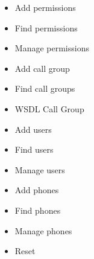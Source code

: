 \documentclass[letterpaper,10pt,english]{sphinxmanual}
\begin{document}
\begin{description}
\item[{}] \leavevmode\begin{itemize}
\item {} 
Add permissions

\item {} 
Find permissions

\item {} 
Manage permissions

\end{itemize}

\item[{}] \leavevmode\begin{itemize}
\item {} 
Add call group

\item {} 
Find call groups

\item {} 
WSDL Call Group

\end{itemize}

\item[{}] \leavevmode\begin{itemize}
\item {} 
Add users

\item {} 
Find users

\item {} 
Manage users

\end{itemize}

\item[{}] \leavevmode\begin{itemize}
\item {} 
Add phones

\item {} 
Find phones

\item {} 
Manage phones

\end{itemize}

\item[{}] \leavevmode\begin{itemize}
\item {} 
Reset

\end{itemize}

\end{description}
\end{document}
